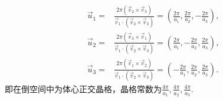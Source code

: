 \documentclass[reqno,a4paper,12pt]{amsart}
\begin{document}
\begin{tcolorbox}[breakable, colback = black!5!white, colframe = black]
\begin{align*}
	\vec{u}_1 =& \frac{2\pi(\vec{v}_2 \times \vec{v}_3)}{\vec{v}_1 \cdot (\vec{v}_2\times\vec{v}_3)} = \left( \frac{2\pi}{a_1}, \frac{2\pi}{a_2}, -\frac{2\pi}{a_3} \right), \\
	\vec{u}_2 =& \frac{2\pi(\vec{v}_3 \times \vec{v}_1)}{\vec{v}_1 \cdot (\vec{v}_2\times\vec{v}_3)} = \left( \frac{2\pi}{a_1}, -\frac{2\pi}{a_2}, \frac{2\pi}{a_3} \right), \\
	\vec{u}_3 =& \frac{2\pi(\vec{v}_1 \times \vec{v}_2)}{\vec{v}_1 \cdot (\vec{v}_2\times\vec{v}_3)} = \left( -\frac{2\pi}{a_1}, \frac{2\pi}{a_2}, \frac{2\pi}{a_3} \right).
\end{align*}
即在倒空间中为体心正交晶格，晶格常数为$\frac{4\pi}{a_1}, \frac{4\pi}{a_2}, \frac{4\pi}{a_3}$.
\end{tcolorbox}
\end{document}
